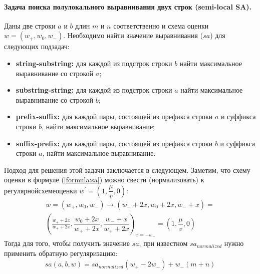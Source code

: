 



\paragraph*{Задача поиска полулокального выравнивания двух строк (semi-local SA).}

Даны две строки $a$ и $b$ длин $m$ и $n$ соответственно и схема оценки $w = (w_{+}, w_{0} , w_{-})$. 
Необходимо найти значение выравнивания ($sa$) для следующих подзадач:
\begin{itemize}
    \item \textbf{string-substring:} для каждой из подстрок строки $b$ найти максимальное выравнивание со строкой $a$; 
    \item \textbf{substring-string:} для каждой из подстрок строки $a$ найти максимальное выравнивание со строкой $b$; 
    \item \textbf{prefix-suffix:} для каждой пары, состоящей из префикса строки $a$ и суффикса строки $b$, найти максимальное выравнивание; 
    \item \textbf{suffix-prefix:} для каждой пары, состоящей из префикса строки $b$ и суффикса строки $a$, найти максимальное выравнивание. 
\end{itemize}
Подход для решения этой задачи заключается в следующем.
Заметим, что  схему оценки в  формуле (\ref{formula:sa}) можно свести (нормализовать) к $регулярной схеме оценки$ $w^{'} = (1,\dfrac{\mu}{v} ,0)$:
\begin{equation}\label{weightNormalization}
    \begin{aligned}
    w = (w_{+}, w_{0} , w_{-}) \xrightarrow{} (w_{+} +2x , w_{0} + 2x , w_{-} + x) =\\ ( \frac{w_{+} +2x}{w_{+} +2x} , \dfrac {w_{0} + 2x}{w_{+} +2x} , \dfrac{w_{-} + x}{w_{+} +2x})_{x=-w_{-}} = (1,\dfrac{\mu}{v} ,0) 
    \end{aligned}
\end{equation}
Тогда для того, чтобы получить значение $sa$, при  известном $sa_{normalized}$ нужно применить обратную регуляризацию:
\begin{equation}
    \begin{aligned}
    sa(a,b,w) = sa_{normalized}  (w_{+} - 2w_{-}) +  w_{-} (m + n)
    \end{aligned}
\end{equation}

